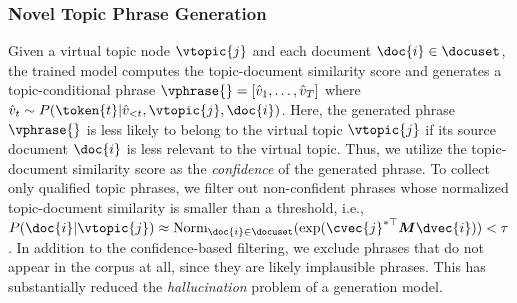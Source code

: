 \subsubsection{Novel Topic Phrase Generation}
\label{subsubsec:collection}
Given a virtual topic node $\vtopic{j}$ and each document $\doc{i}\in\docuset$, the trained model computes the topic-document similarity score and generates a topic-conditional phrase 
$\vphrase{}=[\hat{v}_{1},\ldots,\hat{v}_{T}]$ where $\hat{v}_{t}\sim P(\token{t}|\hat{v}_{<t},\vtopic{j},\doc{i})$.
Here, the generated phrase $\vphrase{}$ is less likely to belong to the virtual topic $\vtopic{j}$ if its source document $\doc{i}$ is less relevant to the virtual topic.
Thus, we utilize the topic-document similarity score as the \textit{confidence} of the generated phrase.
To collect only qualified topic phrases, we filter out non-confident phrases whose normalized topic-document similarity is smaller than a threshold, i.e., $P(\doc{i}|\vtopic{j})\approx\text{Norm}_{\doc{i}\in\docuset}(\exp(\cvec{j}^{*\top} \bm{M} \dvec{i})) < \tau$.
In addition to the confidence-based filtering, we exclude phrases that do not appear in the corpus at all, since they are likely implausible phrases.
This has substantially reduced the \textit{hallucination} problem of a generation model.

